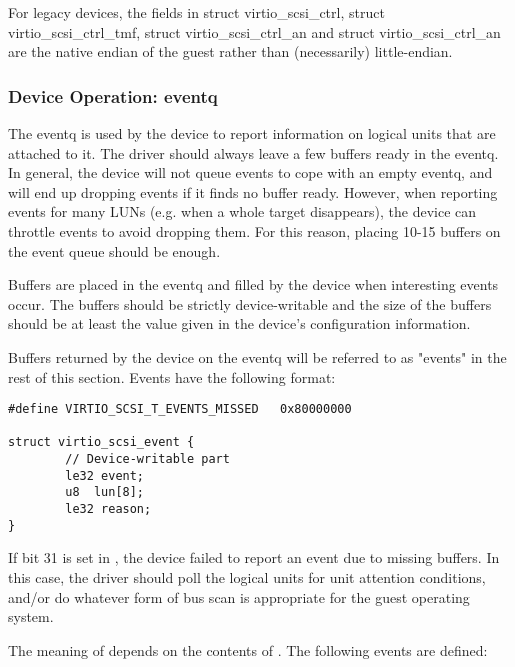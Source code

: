 For legacy devices, the fields in struct virtio_scsi_ctrl, struct
virtio_scsi_ctrl_tmf, struct virtio_scsi_ctrl_an and struct
virtio_scsi_ctrl_an are the native endian of the guest rather than
(necessarily) little-endian.


\subsubsection{Device Operation: eventq}\label{sec:Device Types / SCSI Host Device / Device Operation / Device Operation: eventq}

The eventq is used by the device to report information on logical
units that are attached to it. The driver should always leave a
few buffers ready in the eventq. In general, the device will not
queue events to cope with an empty eventq, and will end up
dropping events if it finds no buffer ready. However, when
reporting events for many LUNs (e.g. when a whole target
disappears), the device can throttle events to avoid dropping
them. For this reason, placing 10-15 buffers on the event queue
should be enough.

Buffers are placed in the eventq and filled by the device when
interesting events occur. The buffers should be strictly
device-writable and the size of the buffers should be
at least the value given in the device's configuration
information.

Buffers returned by the device on the eventq will be referred to
as "events" in the rest of this section. Events have the
following format:

\begin{lstlisting}
#define VIRTIO_SCSI_T_EVENTS_MISSED   0x80000000

struct virtio_scsi_event {
        // Device-writable part
        le32 event;
        u8  lun[8];
        le32 reason;
}
\end{lstlisting}

If bit 31 is set in , the device failed to report
an event due to missing buffers. In this case, the driver should
poll the logical units for unit attention conditions, and/or do
whatever form of bus scan is appropriate for the guest operating
system.

The meaning of  depends on the
contents of . The following events are defined:


